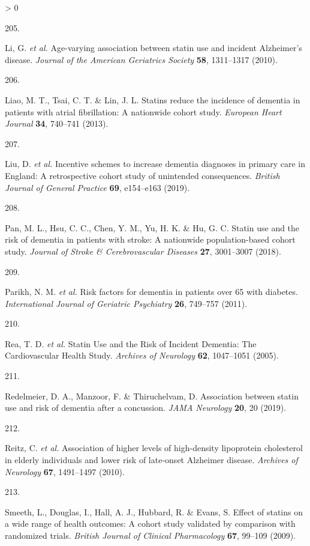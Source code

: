 \documentclass[a4paper, twoside]{templates/ociamthesis}
\newlength{\cslhangindent}
\newlength{\csllabelwidth}
\newenvironment{CSLReferences}[3] %
 {%
  \setlength{\parindent}{0pt}
  \ifodd #1 \everypar{\setlength{\hangindent}{\cslhangindent}}\ignorespaces\fi
  \ifnum #2 > 0
  \setlength{\parskip}{#2\baselineskip}
  \fi
 }%
 {}
\newcommand{\CSLLeftMargin}[1]{\parbox[t]{\maxof{\widthof{#1}}{\csllabelwidth}}{#1}}
\newcommand{\CSLRightInline}[1]{\parbox[t]{\linewidth - \csllabelwidth}{#1}}
\begin{document}
\begin{CSLReferences}{0}{0}
\leavevmode\hypertarget{ref-li2010}{}%
\CSLLeftMargin{205. }
\CSLRightInline{Li, G. \emph{et al.} Age-varying association between statin use and incident {Alzheimer}'s disease. \emph{Journal of the American Geriatrics Society} \textbf{58}, 1311--1317 (2010).}

\leavevmode\hypertarget{ref-liao2013}{}%
\CSLLeftMargin{206. }
\CSLRightInline{Liao, M. T., Tsai, C. T. \& Lin, J. L. Statins reduce the incidence of dementia in patients with atrial fibrillation: A nationwide cohort study. \emph{European Heart Journal} \textbf{34}, 740--741 (2013).}

\leavevmode\hypertarget{ref-liu2019}{}%
\CSLLeftMargin{207. }
\CSLRightInline{Liu, D. \emph{et al.} Incentive schemes to increase dementia diagnoses in primary care in {England}: A retrospective cohort study of unintended consequences. \emph{British Journal of General Practice} \textbf{69}, e154--e163 (2019).}

\leavevmode\hypertarget{ref-pan2018}{}%
\CSLLeftMargin{208. }
\CSLRightInline{Pan, M. L., Hsu, C. C., Chen, Y. M., Yu, H. K. \& Hu, G. C. Statin use and the risk of dementia in patients with stroke: A nationwide population-based cohort study. \emph{Journal of Stroke \& Cerebrovascular Diseases} \textbf{27}, 3001--3007 (2018).}

\leavevmode\hypertarget{ref-parikh2011}{}%
\CSLLeftMargin{209. }
\CSLRightInline{Parikh, N. M. \emph{et al.} Risk factors for dementia in patients over 65 with diabetes. \emph{International Journal of Geriatric Psychiatry} \textbf{26}, 749--757 (2011).}

\leavevmode\hypertarget{ref-rea2005}{}%
\CSLLeftMargin{210. }
\CSLRightInline{Rea, T. D. \emph{et al.} Statin {Use} and the {Risk} of {Incident Dementia}: The {Cardiovascular Health Study}. \emph{Archives of Neurology} \textbf{62}, 1047--1051 (2005).}

\leavevmode\hypertarget{ref-redelmeier2019}{}%
\CSLLeftMargin{211. }
\CSLRightInline{Redelmeier, D. A., Manzoor, F. \& Thiruchelvam, D. Association between statin use and risk of dementia after a concussion. \emph{JAMA Neurology} \textbf{20}, 20 (2019).}

\leavevmode\hypertarget{ref-reitz2010}{}%
\CSLLeftMargin{212. }
\CSLRightInline{Reitz, C. \emph{et al.} Association of higher levels of high-density lipoprotein cholesterol in elderly individuals and lower risk of late-onset {Alzheimer} disease. \emph{Archives of Neurology} \textbf{67}, 1491--1497 (2010).}

\leavevmode\hypertarget{ref-smeeth2009}{}%
\CSLLeftMargin{213. }
\CSLRightInline{Smeeth, L., Douglas, I., Hall, A. J., Hubbard, R. \& Evans, S. Effect of statins on a wide range of health outcomes: A cohort study validated by comparison with randomized trials. \emph{British Journal of Clinical Pharmacology} \textbf{67}, 99--109 (2009).}


\end{CSLReferences}
\end{document}

